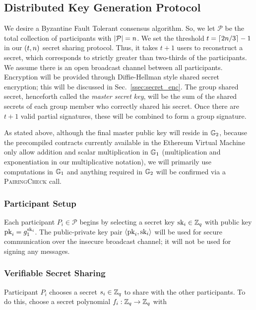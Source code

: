 \subsection{Distributed Key Generation Protocol}
\label{ssec:dkg}

We desire a Byzantine Fault Tolerant consensus algorithm.
So, we let $\mathcal{P}$ be the total collection of participants with
$\left| \mathcal{P} \right| = n$.
We set the threshold $t = \left\lceil 2n/3 \right\rceil - 1$ in our $\left( t,n \right)$
secret sharing protocol.
Thus, it takes $t+1$ users to reconstruct a secret, which corresponds
to strictly greater than two-thirds of the participants.
We assume there is an open broadcast channel between all participants.
Encryption will be provided through Diffie-Hellman style shared
secret encryption; this will be discussed in Sec.~\ref{ssec:secret_enc}.
The group shared secret, henceforth called the \emph{master secret key},
will be the sum of the shared secrets of
each group member who correctly shared his secret.
Once there are $t+1$ valid partial signatures, these will be
combined to form a group signature.

As stated above, although the final master public key will
reside in $\mathbb{G}_{2}$, because the precompiled contracts
currently available in the Ethereum Virtual Machine only allow addition
and scalar multiplication in $\mathbb{G}_{1}$ (multiplication and exponentiation
in our multiplicative notation), we will primarily
use computations in $\mathbb{G}_{1}$ and anything required
in $\mathbb{G}_{2}$ will be confirmed via a \textsc{PairingCheck} call.

\subsubsection{Participant Setup}
Each participant $P_{i}\in\mathcal{P}$ begins by selecting
a secret key $\textrm{sk}_{i}\in\mathbb{Z}_{q}$ with public key $\textrm{pk}_{i} = g_{1}^{\textrm{sk}_{i}}$.
The public-private key pair $\left\langle \textrm{pk}_{i},\textrm{sk}_{i} \right\rangle$ will be
used for secure communication over the insecure broadcast channel;
it will not be used for signing any messages.

\subsubsection{Verifiable Secret Sharing}

Participant $P_{i}$ chooses a secret
$s_{i}\in\mathbb{Z}_{q}$ to share with the other participants.
To do this, choose a secret polynomial $f_{i}:\mathbb{Z}_{q}\to\mathbb{Z}_{q}$
with

